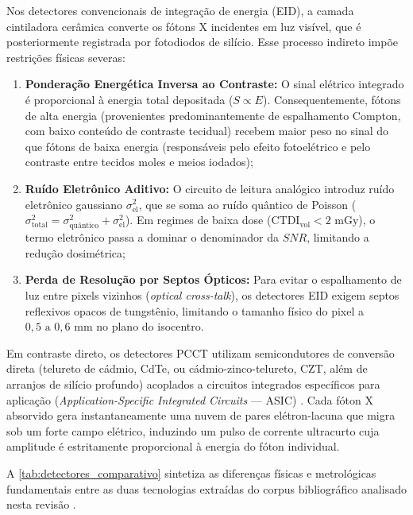 \documentclass[
  12pt,
  a4paper,
  oneside
]{report}
\begin{document}
Nos detectores convencionais de integração de energia (EID), a camada cintiladora cerâmica converte os fótons X incidentes em luz visível, que é posteriormente registrada por fotodiodos de silício. Esse processo indireto impõe restrições físicas severas:
\begin{enumerate}
  \item \textbf{Ponderação Energética Inversa ao Contraste:} O sinal elétrico integrado é proporcional à energia total depositada ($S \propto E$). Consequentemente, fótons de alta energia (provenientes predominantemente de espalhamento Compton, com baixo conteúdo de contraste tecidual) recebem maior peso no sinal do que fótons de baixa energia (responsáveis pelo efeito fotoelétrico e pelo contraste entre tecidos moles e meios iodados);
  \item \textbf{Ruído Eletrônico Aditivo:} O circuito de leitura analógico introduz ruído eletrônico gaussiano $\sigma_{\text{el}}^2$, que se soma ao ruído quântico de Poisson ($\sigma_{\text{total}}^2 = \sigma_{\text{quântico}}^2 + \sigma_{\text{el}}^2$). Em regimes de baixa dose ($\text{CTDI}_{\text{vol}} < 2\text{ mGy}$), o termo eletrônico passa a dominar o denominador da $SNR$, limitando a redução dosimétrica;
  \item \textbf{Perda de Resolução por Septos Ópticos:} Para evitar o espalhamento de luz entre pixels vizinhos (\emph{optical cross-talk}), os detectores EID exigem septos reflexivos opacos de tungstênio, limitando o tamanho físico do pixel a $0{,}5\text{ a }0{,}6\text{ mm}$ no plano do isocentro.
\end{enumerate}

Em contraste direto, os detectores PCCT utilizam semicondutores de conversão direta (telureto de cádmio, CdTe, ou cádmio-zinco-telureto, CZT, além de arranjos de silício profundo) acoplados a circuitos integrados específicos para aplicação (\emph{Application-Specific Integrated Circuits} --- ASIC) \cite{willemink2018, rajendran2021}. Cada fóton X absorvido gera instantaneamente uma nuvem de pares elétron-lacuna que migra sob um forte campo elétrico, induzindo um pulso de corrente ultracurto cuja amplitude é estritamente proporcional à energia do fóton individual.

A \cref{tab:detectores_comparativo} sintetiza as diferenças físicas e metrológicas fundamentais entre as duas tecnologias extraídas do corpus bibliográfico analisado nesta revisão \cite{willemink2018, rajendran2021, mccollough2026, pimenta2026, greffier2026}.
\end{document}
